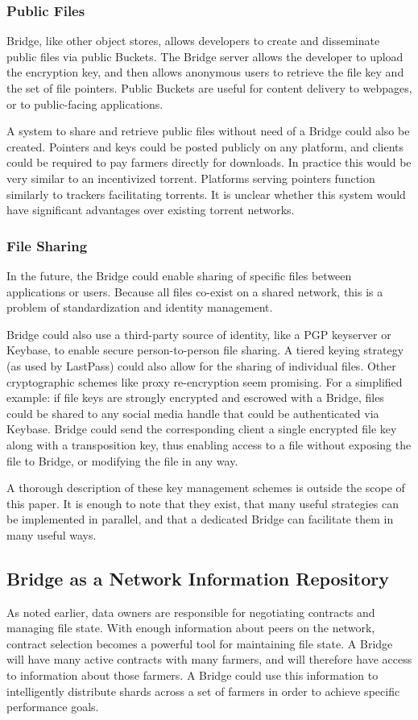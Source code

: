 \documentclass[a4paper,10pt]{article}
\begin{document}
\subsubsection{Public Files}
Bridge, like other object stores, allows developers to create and disseminate public files via public Buckets. The Bridge server allows the developer to upload the encryption key, and then allows anonymous users to retrieve the file key and the set of file pointers. Public Buckets are useful for content delivery to webpages, or to public-facing applications.

A system to share and retrieve public files without need of a Bridge could also be created. Pointers and keys could be posted publicly on any platform, and clients could be required to pay farmers directly for downloads. In practice this would be very similar to an incentivized torrent. Platforms serving pointers function similarly to trackers facilitating torrents. It is unclear whether this system would have significant advantages over existing torrent networks.

\subsubsection{File Sharing}
In the future, the Bridge could enable sharing of specific files between applications or users. Because all files co-exist on a shared network, this is a problem of standardization and identity management.

Bridge could also use a third-party source of identity, like a PGP keyserver or Keybase\cite{29}, to enable secure person-to-person file sharing. A tiered keying strategy (as used by LastPass\cite{28}) could also allow for the sharing of individual files. Other cryptographic schemes like proxy re-encryption seem promising. For a simplified example: if file keys are strongly encrypted and escrowed with a Bridge, files could be shared to any social media handle that could be authenticated via Keybase. Bridge could send the corresponding client a single encrypted file key along with a transposition key, thus enabling access to a file without exposing the file to Bridge, or modifying the file in any way.

A thorough description of these key management schemes is outside the scope of this paper. It is enough to note that they exist, that many useful strategies can be implemented in parallel, and that a dedicated Bridge can facilitate them in many useful ways.

\subsection{Bridge as a Network Information Repository}
As noted earlier, data owners are responsible for negotiating contracts and managing file state. With enough information about peers on the network, contract selection becomes a powerful tool for maintaining file state. A Bridge will have many active contracts with many farmers, and will therefore have access to information about those farmers. A Bridge could use this information to intelligently distribute shards across a set of farmers in order to achieve specific performance goals.
\end{document}
